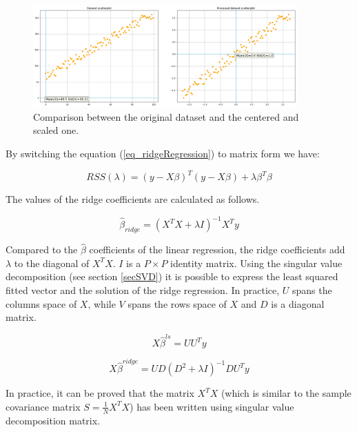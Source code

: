\begin{figure}[hbt!]
\centering
\includegraphics[width=0.9\textwidth]{SectionLetsMath/linearRegression_figures/fig_scalingCentering.png}
\captionsetup{type=figure}
\caption{Comparison between the original dataset and the centered and scaled one.}
\label{fig_scalingCentering}
\end{figure}

By switching the equation (\ref{eq_ridgeRegression}) to matrix form we have:

\begin{equation}
RSS\left(\lambda\right)=\left(y-X\beta\right)^T\left(y-X\beta\right)+\lambda\beta^T\beta
\label{eq_ridgeRegression1}
\end{equation}

The values of the ridge coefficients are calculated as follows.

\begin{equation}
{\hat{\beta}}_{ridge}=\left(X^TX+\lambda I\right)^{-1}X^Ty
\label{eq_ridgeRegression2}
\end{equation}

Compared to the  $\hat{\beta}$ coefficients of the linear regression, the ridge coefficients add $\lambda$ to the diagonal of $X^TX$. $I$ is a $P\times P$ identity matrix. Using the singular value decomposition (see section \ref{secSVD}) it is possible to express the least squared fitted vector and the solution of the ridge regression. In practice, $U$ spans the columns space of $X$, while $V$ spans the rows space of $X$ and $D$ is a diagonal matrix.

\begin{equation}
X{\hat{\beta}}^{ls}=UU^Ty
\label{eq_ridgeRegression3}
\end{equation}

\begin{equation}
X{\hat{\beta}}^{ridge}=UD\left(D^2+\lambda I\right)^{-1}DU^Ty
\label{eq_ridgeRegression4}
\end{equation}

In practice, it can be proved that the matrix $X^TX$ (which is similar to the sample covariance matrix $S=\frac{1}{N}X^TX$)  has been written using singular value decomposition matrix.

